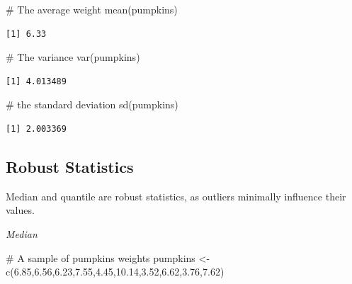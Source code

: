 \documentclass[
  letterpaper,
]{book}
\newenvironment{Shaded}{\begin{snugshade}}{\end{snugshade}}
\newcommand{\CommentTok}[1]{\textcolor[rgb]{0.37,0.37,0.37}{#1}}
\newcommand{\FloatTok}[1]{\textcolor[rgb]{0.68,0.00,0.00}{#1}}
\newcommand{\FunctionTok}[1]{\textcolor[rgb]{0.28,0.35,0.67}{#1}}
\newcommand{\NormalTok}[1]{\textcolor[rgb]{0.00,0.23,0.31}{#1}}
\newcommand{\OtherTok}[1]{\textcolor[rgb]{0.00,0.23,0.31}{#1}}
\begin{document}
\begin{Shaded}
\begin{Highlighting}[]
\CommentTok{\# The average weight}
\FunctionTok{mean}\NormalTok{(pumpkins)}
\end{Highlighting}
\end{Shaded}

\begin{verbatim}
[1] 6.33
\end{verbatim}

\begin{Shaded}
\begin{Highlighting}[]
\CommentTok{\# The variance}
\FunctionTok{var}\NormalTok{(pumpkins)}
\end{Highlighting}
\end{Shaded}

\begin{verbatim}
[1] 4.013489
\end{verbatim}

\begin{Shaded}
\begin{Highlighting}[]
\CommentTok{\# the standard deviation}
\FunctionTok{sd}\NormalTok{(pumpkins)}
\end{Highlighting}
\end{Shaded}

\begin{verbatim}
[1] 2.003369
\end{verbatim}

\subsection*{Robust Statistics}\label{robust-statistics}

Median and quantile are robust statistics, as outliers minimally
influence their values.

\emph{Median}

\begin{Shaded}
\begin{Highlighting}[]
\CommentTok{\# A sample of pumpkins\textquotesingle{} weights}
\NormalTok{pumpkins }\OtherTok{\textless{}{-}} \FunctionTok{c}\NormalTok{(}\FloatTok{6.85}\NormalTok{,}\FloatTok{6.56}\NormalTok{,}\FloatTok{6.23}\NormalTok{,}\FloatTok{7.55}\NormalTok{,}\FloatTok{4.45}\NormalTok{,}\FloatTok{10.14}\NormalTok{,}\FloatTok{3.52}\NormalTok{,}\FloatTok{6.62}\NormalTok{,}\FloatTok{3.76}\NormalTok{,}\FloatTok{7.62}\NormalTok{)}
\end{Highlighting}
\end{Shaded}
\end{document}
